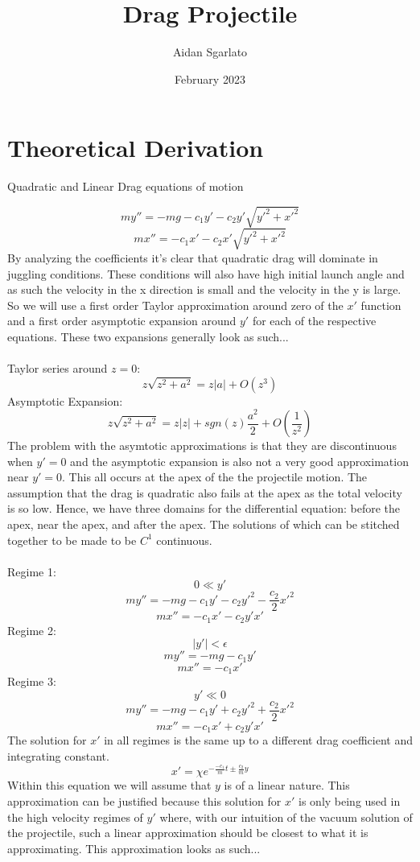 \documentclass{article}
\title{Drag Projectile}
\author{Aidan Sgarlato}
\date{February 2023}
\begin{document}
\maketitle

\section{Theoretical Derivation}
\noindent
Quadratic and Linear Drag equations of motion

$$
my''=-mg-c_{1}y'-c_{2}y'\sqrt{y'^{2}+x'^{2}}
$$
$$
mx''=-c_{1}x'-c_{2}x'\sqrt{y'^{2}+x'^2}
$$
By analyzing the coefficients it's clear that quadratic drag will dominate in juggling conditions. These conditions will also have high initial launch angle and as such the velocity in the x direction is small and the velocity in the y is large. So we will use a first order Taylor approximation around zero of the $x'$ function and a first order asymptotic expansion around $y'$ for each of the respective equations. These two expansions generally look as such...
\\
\\
Taylor series around $z=0$:
$$
z\sqrt{z^{2}+a^{2}} = z|a|+O(z^{3})
$$
Asymptotic Expansion:
$$
z\sqrt{z^{2}+a^{2}} = z|z|+sgn(z)\frac{a^{2}}{2} + O(\frac{1}{z^{2}})
$$
The problem with the asymtotic approximations is that they are discontinuous when $y'=0$ and the asymptotic expansion is also not a very good approximation near $y'=0$. This all occurs at the apex of the the projectile motion. The assumption that the drag is quadratic also fails at the apex as the total velocity is so low. Hence, we have three domains for the differential equation: before the apex, near the apex, and after the apex. The solutions of which can be stitched together to be made to be $C^{1}$ continuous.
\\
\\
Regime 1:
$$
0 \ll y'
$$
$$
my''=-mg-c_{1}y'-c_{2}y'^{2}-\frac{c_{2}}{2}x'^{2}
$$
$$
mx''=-c_{1}x'-c_{2}y'x'
$$
Regime 2:
$$
|y'| < \epsilon
$$
$$
my''=-mg-c_{1}y'
$$
$$
mx''=-c_{1}x'
$$
Regime 3:
$$
y' \ll 0
$$
$$
my''=-mg-c_{1}y'+c_{2}y'^{2}+\frac{c_{2}}{2}x'^{2}
$$
$$
mx''=-c_{1}x'+c_{2}y'x'
$$
The solution for $x'$ in all regimes is the same up to a different drag coefficient and integrating constant.
$$
x'=\chi e^{-\frac{-c_{1}}{m}t \pm \frac{c_{2}}{m}y}
$$
Within this equation we will assume that $y$ is of a linear nature. This approximation can be justified because this solution for $x'$ is only being used in the high velocity regimes of $y'$ where, with our intuition of the vacuum solution of the projectile, such a linear approximation should be closest to what it is approximating. This approximation looks as such...
\end{document}
